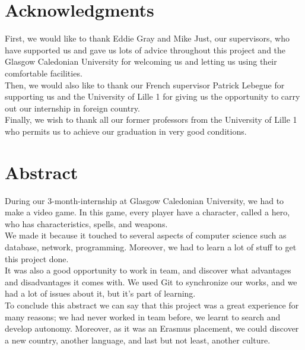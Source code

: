 \documentclass{scrreprt}
\begin{document}
\newcommand{\HRule}{\rule{\linewidth}{0.5mm}}


\chapter*{Acknowledgments} %
First, we would like to thank Eddie Gray and Mike Just, our supervisors, who have supported us and
gave us lots of advice throughout this project and the Glasgow Caledonian University for
welcoming us and letting us using their comfortable facilities.\\

	  Then, we would also like to thank our French supervisor Patrick Lebegue for supporting us
	  and the University of Lille 1 for giving us the opportunity to carry out our internship in foreign country.\\

	  Finally, we wish to thank all our former professors from the University of Lille 1 who
	  permits us to achieve our graduation in very good conditions.\\

	  \chapter*{Abstract}
	  During our 3-month-internship at Glasgow Caledonian University, we had to make a video game.
	  In this game, every player have a character, called a hero, who has characteristics, spells, and weapons.\\

	             We made it because it touched to several aspects of computer science such as database, network,
	 	  programming. Moreover, we had to learn a lot of stuff to get this project done.\\
		  It was also a good opportunity to work in team, and discover what advantages and disadvantages it comes with.
		  We used Git to synchronize our works, and we had a lot of issues about it, but it's part of learning.\\

		  To conclude this abstract we can say that this project was a great experience for many
		  reasons; we had never worked in team before, we learnt to search and develop
		  autonomy. Moreover, as it was an Erasmus placement, we could discover a new country,
		  another language, and last but not least, another culture.
\end{document}
